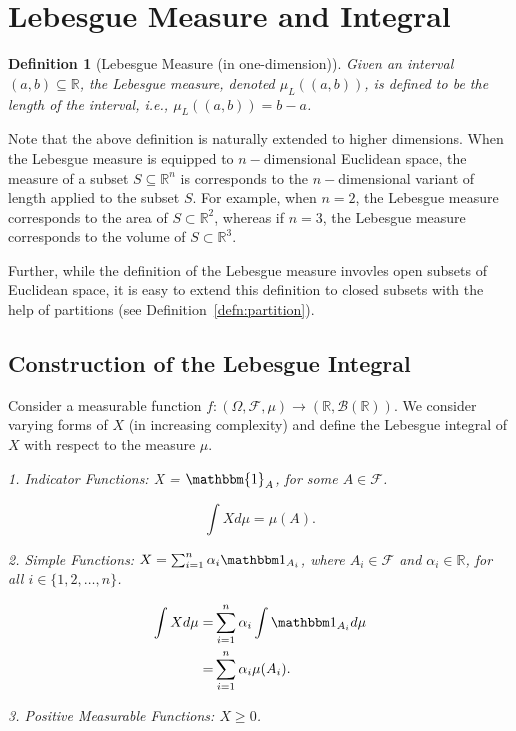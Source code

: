 \documentclass[10pt, oneside]{article}
\newcommand{\R}{\mathbb{R}}
\newtheorem{defn}{Definition}
\begin{document}
\section{Lebesgue Measure and Integral}
\begin{defn}[Lebesgue Measure (in one-dimension)]
    Given an interval $(a,b) \subseteq \R$, the Lebesgue measure, denoted $\mu_L((a,b))$, 
    is defined to be the length of the interval, i.e., $\mu_L((a,b)) = b-a$. 
\end{defn}
Note that the above definition is naturally extended to higher dimensions. When the 
Lebesgue measure is equipped to $n-$dimensional Euclidean space, the measure of a subset 
$S \subseteq \R^{n}$ is corresponds to the $n-$dimensional variant of length applied to 
the subset $S$. For example, when $n=2$, the Lebesgue measure corresponds to the area of 
$S \subset \R^2$, whereas if $n=3$, the Lebesgue measure corresponds to the volume of $S
\subset \R^3$. 

Further, while the definition of the Lebesgue measure invovles open subsets of Euclidean 
space, it is easy to extend this definition to closed subsets with the help of partitions
(see Definition~\ref{defn:partition}).  

\subsection{Construction of the Lebesgue Integral}
Consider a measurable function $f \colon (\Omega, \mathcal{F}, \mu) \to (\R,\mathcal{B}(\R))$. 
We consider varying forms of $X$ (in increasing complexity) and define the Lebesgue integral 
of $X$ with respect to the measure $\mu$. 

\emph{1. Indicator Functions:  X = $\mathbbm{1}_A$, for some $A \in \mathcal{F}$. }

\[\int{X d\mu} = \mu(A). \]

\emph{2. Simple Functions: $X = \sum_{i=1}^{n}\alpha_{i}\ind_{A_{i}}$, where $A_{i} \in \mathcal{F}$
and $\alpha_{i} \in \R$, for all $i \in \{1,2,\dots,n\}$.} 

\begin{align*}
    \int{X d\mu} = & \sum_{i=1}^{n}\alpha_{i} \int{\ind_{A_{i}} d\mu} \\
                 = & \sum_{i=1}^{n}\alpha_{i} \mu(A_{i}). 
\end{align*}

\emph{3. Positive Measurable Functions: $X \geq 0$. }

\end{document}
